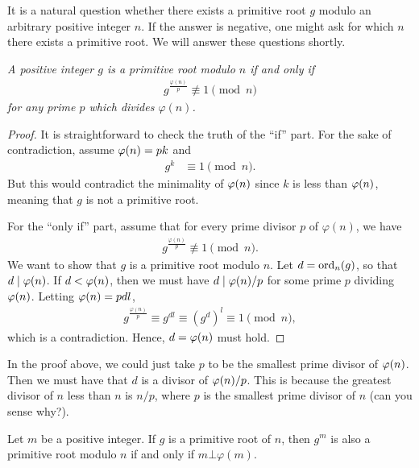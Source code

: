 \documentclass{subfile}
\begin{document}
It is a natural question whether there exists a primitive root $g$ modulo an arbitrary positive integer $n$. If the answer is negative, one might ask for which $n$ there exists a primitive root. We will answer these questions shortly.

	\begin{theorem}\slshape\label{thm:prTest}
		A positive integer $g$ is a primitive root modulo $n$ if and only if 
			\begin{align*}
				g^{\frac{\varphi(n)}{p}}\not\equiv1\pmod n
			\end{align*}
		for any prime $p$ which divides $\varphi(n)$. 
	\end{theorem}
	
	\begin{proof}
		It is straightforward to check the truth of the ``if'' part. For the sake of contradiction, assume $\varphi(n)=pk$ and
			\begin{align*}
				g^{k} & \equiv1\pmod n.
			\end{align*}
		But this would contradict the minimality of $\varphi(n)$ since $k$ is less than $\varphi(n)$, meaning that $g$ is not a primitive root.
		
		For the ``only if'' part, assume that for every prime divisor $p$ of $\varphi(n)$, we have
			\begin{align*}
				g^{\frac{\varphi(n)}{p}}\not\equiv1\pmod n.
			\end{align*}
		We want to show that $g$ is a primitive root modulo $n$. Let $d=\operatorname{ord}_n(g)$, so that $d \mid \varphi(n)$. If $d<\varphi(n)$, then we must have $d\mid {\varphi(n)}/{p}$ for some prime $p$ dividing $\varphi(n)$. Letting $\varphi(n)=pdl$,
			\begin{align*}
				g^{\frac{\varphi(n)}{p}} \equiv g^{dl} \equiv \left(g^d\right)^l \equiv1\pmod n,
			\end{align*}
		which is a contradiction. Hence, $d=\varphi(n)$ must hold.
	\end{proof}
	
	\begin{note}
		In the proof above, we could just take $p$ to be the smallest prime divisor of $\varphi(n)$. Then we must have that $d$ is a divisor of ${\varphi(n)}/{p}$. This is because the greatest divisor of $n$ less than $n$ is ${n}/{p}$, where $p$ is the smallest prime divisor of $n$ (can you sense why?).
	\end{note}
	
	\begin{corollary}\label{cor:prpower}
		Let $m$ be a positive integer. If $g$ is a primitive root of $n$, then $g^m$ is also a primitive root modulo $n$ if and only if $m \bot \varphi(m)$.
	\end{corollary}
	
\end{document}
